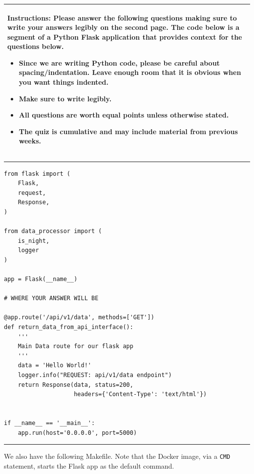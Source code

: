 \documentclass[11pt]{article}
\begin{document}
\begin{table}[h]
\centering
{} %
\begin{tabular}{|p{\textwidth}|}
\hline
\begin{minipage}[t]{\textwidth}
\vspace{0pt}  %
\noindent \textbf{Instructions:} Please answer the following questions making sure to write your answers legibly on the second page. The code below is a segment of a Python Flask application that provides context for the questions below.
\begin{itemize}
\item Since we are writing Python code, please be careful about spacing/indentation. Leave enough room that it is obvious when you want things indented. 
\item Make sure to write legibly.
\item All questions are worth equal points unless otherwise stated.
\item The quiz is cumulative and may include material from previous weeks.
\end{itemize}
\end{minipage} 
\\
\hline
\end{tabular}
\end{table}

{\color{lightgray}\hrule}
\begin{verbatim}
from flask import (
    Flask,
    request,
    Response,
)

from data_processor import (
    is_night,
    logger
)

app = Flask(__name__)

# WHERE YOUR ANSWER WILL BE

@app.route('/api/v1/data', methods=['GET'])
def return_data_from_api_interface():
    '''
    Main Data route for our flask app
    '''
    data = 'Hello World!'
    logger.info("REQUEST: api/v1/data endpoint")
    return Response(data, status=200,
                    headers={'Content-Type': 'text/html'})


if __name__ == '__main__':
    app.run(host='0.0.0.0', port=5000)
\end{verbatim}
{\color{lightgray}\hrule}

\vspace{0.5cm}
\noindent We also have the following Makefile. Note that the Docker image, via a \texttt{CMD} statement, starts the Flask app as the default command.
\end{document}
